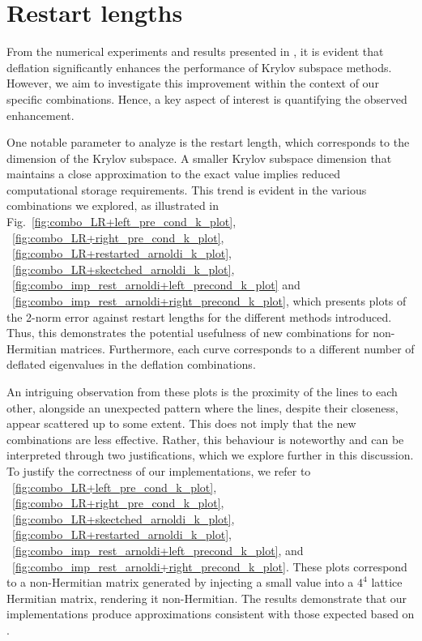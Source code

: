 \section{Restart lengths}
\label{sec:restart_lengths}

From the numerical experiments and results presented in \cite{11, 52}, it is evident that deflation significantly enhances the performance of Krylov subspace methods. However, we aim to investigate this improvement within the context of our specific combinations. Hence, a key aspect of interest is quantifying the observed enhancement.

One notable parameter to analyze is the restart length, which corresponds to the dimension of the Krylov subspace. A smaller Krylov subspace dimension that maintains a close approximation to the exact value implies reduced computational storage requirements. This trend is evident in the various combinations we explored, as illustrated in Fig.~\ref{fig:combo_LR+left_pre_cond_k_plot}, ~\ref{fig:combo_LR+right_pre_cond_k_plot}, ~\ref{fig:combo_LR+restarted_arnoldi_k_plot}, ~\ref{fig:combo_LR+skectched_arnoldi_k_plot}, ~\ref{fig:combo_imp_rest_arnoldi+left_precond_k_plot} and ~\ref{fig:combo_imp_rest_arnoldi+right_precond_k_plot}, which presents plots of the 2-norm error against restart lengths for the different methods introduced. Thus, this demonstrates the potential usefulness of new combinations for non-Hermitian matrices. Furthermore, each curve corresponds to a different number of deflated eigenvalues in the deflation combinations.

An intriguing observation from these plots is the proximity of the lines to each other, alongside an unexpected pattern where the lines, despite their closeness, appear scattered up to some extent. This does not imply that the new combinations are less effective. Rather, this behaviour is noteworthy and can be interpreted through two justifications, which we explore further in this discussion. To justify the correctness of our implementations, we refer to ~\ref{fig:combo_LR+left_pre_cond_k_plot}, ~\ref{fig:combo_LR+right_pre_cond_k_plot}, ~\ref{fig:combo_LR+skectched_arnoldi_k_plot}, ~\ref{fig:combo_LR+restarted_arnoldi_k_plot},  ~\ref{fig:combo_imp_rest_arnoldi+left_precond_k_plot}, and ~\ref{fig:combo_imp_rest_arnoldi+right_precond_k_plot}. These plots correspond to a non-Hermitian matrix generated by injecting a small value into a $4^4$ lattice Hermitian matrix, rendering it non-Hermitian. The results demonstrate that our implementations produce approximations consistent with those expected based on \cite{11}.


